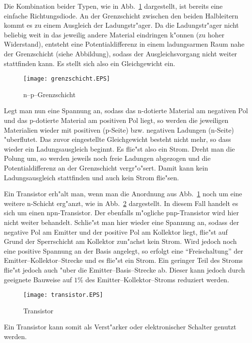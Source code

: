 \documentclass[a4paper,10pt]{article}
\begin{document}
Die Kombination beider Typen, wie in Abb.~\ref{fig:1} dargestellt, ist bereits eine einfache Richtungsdiode. An der Grenzschicht zwischen den beiden Halbleitern kommt es zu einem Ausgleich der Ladungstr"ager. Da die Ladungstr"ager nicht beliebig weit in das jeweilig andere Material eindringen k"onnen (zu hoher Widerstand), entsteht eine Potentialdifferenz in einem ladungsarmen Raum nahe der Grenzschicht (siehe Abbildung), sodass der Ausgleichsvorgang nicht weiter stattfinden kann. Es stellt sich also ein Gleichgewicht ein.
\begin{figure}[htb]
	\centering
	\texttt{[image: grenzschicht.EPS]}
	\caption{n--p--Grenzschicht}
	\label{fig:1}
\end{figure}

Legt man nun eine Spannung an, sodass das n-dotierte Material am negativen Pol und das p-dotierte Material am positiven Pol liegt, so werden die jeweiligen Materialien wieder mit positiven (p-Seite) bzw. negativen Ladungen (n-Seite) "uberflutet. Das zuvor eingestellte Gleichgewicht besteht nicht mehr, so dass wieder ein Ladungsausgleich beginnt. Es flie"st also ein Strom. Dreht man die Polung um, so werden jeweils noch freie Ladungen abgezogen und die Potentialdifferenz an der Grenzschicht vergr"o"sert. Damit kann kein Ladungsausgleich stattfinden und auch kein Strom flie"sen.

Ein Transistor erh"alt man, wenn man die Anordnung aus Abb.~\ref{fig:1} noch um eine weitere n-Schicht erg"anzt, wie in Abb.~\ref{fig:2} dargestellt. In diesem Fall handelt es sich um einen npn-Transistor. Der ebenfalls m"ogliche pnp-Transistor wird hier nicht weiter behandelt. Schlie"st man hier wieder eine Spannung an, sodass der negative Pol am Emitter und der positive Pol am Kollektor liegt, flie"st auf Grund der Sperrschicht am Kollektor zun"achst kein Strom. Wird jedoch noch eine positive Spannung an der Basis angelegt, so erfolgt eine "`Freischaltung"' der Emitter--Kollektor--Strecke und es flie"st ein Strom. Ein geringer Teil des Stroms flie"st jedoch auch "uber die Emitter--Basis--Strecke ab. Dieser kann jedoch durch geeignete Bauweise auf $1 \%$ des Emitter--Kollektor--Stroms reduziert werden.

\begin{figure}[hbt]
	\centering
	\texttt{[image: transistor.EPS]}
	\caption{Transistor}
	\label{fig:2}
\end{figure}

Ein Transistor kann somit als Verst"arker oder elektronischer Schalter genutzt werden.
\end{document}
